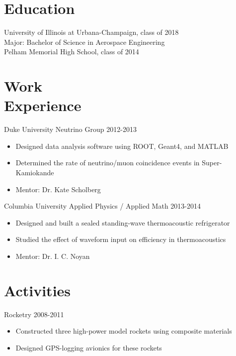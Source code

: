 \documentclass[margin]{res}
\begin{document}
 
\address{remy.goldschmidt@gmail.com \\ \url{http://github.com/taktoa} \\ \url{http://taktoa.me} \\ URH 512 Townsend \\ 918 W. Illinois St. \\ Urbana, IL 61801-3095 \\ +1 (914) 703-5652 }

\begin{resume}

\section{Education} 
University of Illinois at Urbana-Champaign, class of 2018 \\
Major: Bachelor of Science in Aerospace Engineering \\
Pelham Memorial High School, class of 2014

\section{Work \\ Experience}
Duke University Neutrino Group \hfill 2012-2013
  \begin{itemize} \itemsep -2pt
    \item Designed data analysis software using ROOT, Geant4, and MATLAB
    \item Determined the rate of neutrino/muon coincidence events in Super-Kamiokande
    \item Mentor: Dr. Kate Scholberg
  \end{itemize}

Columbia University Applied Physics / Applied Math \hfill 2013-2014
  \begin{itemize} \itemsep -2pt
    \item Designed and built a sealed standing-wave thermoacoustic refrigerator
    \item Studied the effect of waveform input on efficiency in thermoacoustics
    \item Mentor: Dr. I. C. Noyan
  \end{itemize}

\section{Activities}
Rocketry \hfill 2008-2011
  \begin{itemize} \itemsep -2pt
    \item Constructed three high-power model rockets using composite materials
    \item Designed GPS-logging avionics for these rockets
  \end{itemize}


\end{resume}
\end{document}
